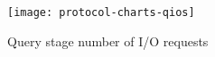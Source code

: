 \begin{figure}[h]
	\centering
	\texttt{[image: protocol-charts-qios]}
	\caption{Query stage number of I/O requests \cite[Figure 2d]{ore-benchmark-17}}\label{figure:ore}
\end{figure}
